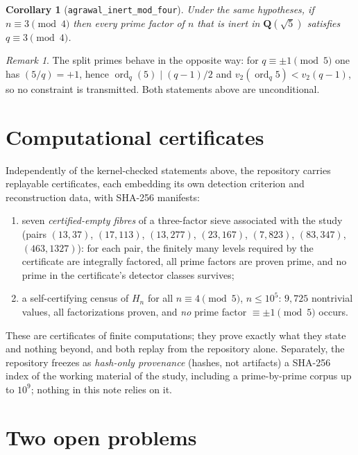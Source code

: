 \documentclass[11pt]{amsart}
\newtheorem{corollary}[theorem]{Corollary}
\theoremstyle{remark}
\newtheorem{remark}[theorem]{Remark}
\newcommand{\lean}[1]{\texttt{#1}}
\begin{document}
\begin{corollary}[\lean{agrawal\_inert\_mod\_four}]\label{cor:modfour}
Under the same hypotheses, if \(n\equiv3\pmod4\) then every prime
factor of \(n\) that is inert in \(\mathbf{Q}(\sqrt5)\) satisfies
\(q\equiv3\pmod4\).
\end{corollary}

\begin{remark}
The split primes behave in the opposite way: for \(q\equiv\pm1\pmod5\)
one has \((5/q)=+1\), hence \(\operatorname{ord}_q(5)\mid(q-1)/2\) and
\(v_2(\operatorname{ord}_q5)<v_2(q-1)\), so no constraint is
transmitted. Both statements above are unconditional.
\end{remark}

\section{Computational certificates}

Independently of the kernel-checked statements above, the repository
carries replayable certificates, each embedding its own detection
criterion and reconstruction data, with SHA-256 manifests:

\begin{enumerate}
\item seven \emph{certified-empty fibres} of a three-factor sieve
associated with the study (pairs
\((13,37)\), \((17,113)\), \((13,277)\), \((23,167)\), \((7,823)\),
\((83,347)\), \((463,1327)\)): for each pair, the finitely many
levels required by the certificate are integrally factored, all prime
factors are proven prime, and no prime in the certificate's detector
classes survives;
\item a self-certifying census of \(H_n\) for all
\(n\equiv4\pmod5\), \(n\le10^5\): \(9{,}725\) nontrivial values,
all factorizations proven, and \emph{no} prime factor
\(\equiv\pm1\pmod5\) occurs.
\end{enumerate}

These are certificates of finite computations; they prove exactly
what they state and nothing beyond, and both replay from the
repository alone. Separately, the repository freezes as
\emph{hash-only provenance} (hashes, not artifacts) a SHA-256 index
of the working material of the study, including a prime-by-prime
corpus up to \(10^9\); nothing in this note relies on it.

\section{Two open problems}
\end{document}
